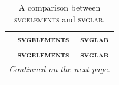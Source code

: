 \begin{longtable}{p{4cm}>{\centering\arraybackslash}p{3.5cm}>{\centering\arraybackslash}p{3.75cm}}
    \caption{A comparison between \textsc{svgelements} and \textsc{svglab}.}
    \label{tab:svglab-comparison} \\
    \toprule
    & \textbf{\textsc{svgelements}} & \textbf{\textsc{svglab}} \\
    \midrule
    \endfirsthead

    \toprule
    & \textbf{\textsc{svgelements}} & \textbf{\textsc{svglab}} \\
    \midrule
    \endhead

    \midrule
    \multicolumn{3}{r}{\footnotesize{\textit{Continued on the next page.}}} \\
    \midrule
    \endfoot

    \bottomrule
    \endlastfoot


\end{longtable}

